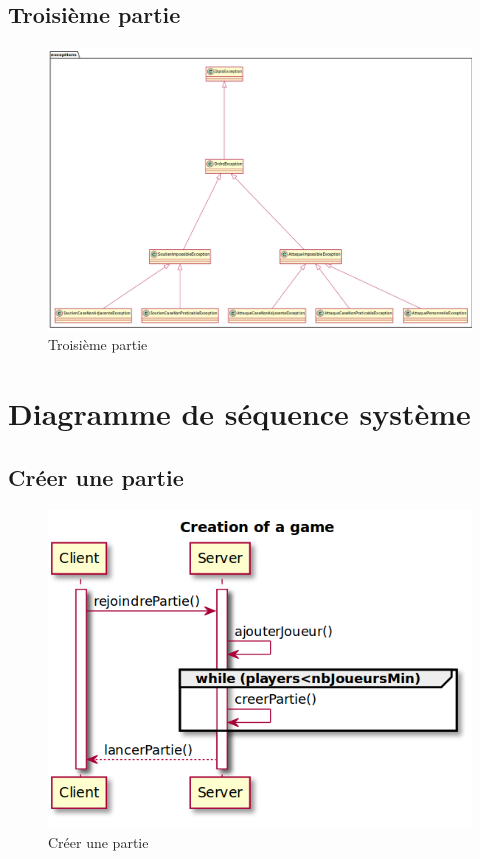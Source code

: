 \subsection{Troisième partie}
	\vspace{10mm}
	\begin{figure}[!h]
		\centering
		\includegraphics[scale=0.3]{images/DP3.png}
		\caption{Troisième partie}
	\end{figure}

\newpage
\section{Diagramme de séquence système}
\subsection{Créer une partie}
	\vspace{10mm}
	\begin{figure}[!h]
		\centering
		\includegraphics[scale=0.5]{images/DSSCreate.png}
		\caption{Créer une partie}
	\end{figure}


